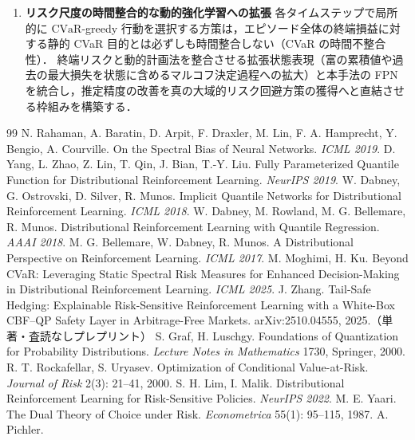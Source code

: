 \documentclass[a4paper,10pt]{jsarticle}
\theoremstyle{definition}
\newcommand{\CVaR}{\mathrm{CVaR}}
\begin{document}
\begin{enumerate}
  \item \textbf{リスク尺度の時間整合的な動的強化学習への拡張}\quad
  各タイムステップで局所的に $\CVaR$-greedy 行動を選択する方策は，エピソード全体の終端損益に対する静的 CVaR 目的とは必ずしも時間整合しない（CVaR の時間不整合性）．
  終端リスクと動的計画法を整合させる拡張状態表現（富の累積値や過去の最大損失を状態に含めるマルコフ決定過程への拡大）と本手法の FPN を統合し，推定精度の改善を真の大域的リスク回避方策の獲得へと直結させる枠組みを構築する．
\end{enumerate}

\begin{thebibliography}{99}
\footnotesize
{} N. Rahaman, A. Baratin, D. Arpit, F. Draxler, M. Lin, F. A. Hamprecht, Y. Bengio, A. Courville.
On the Spectral Bias of Neural Networks. \textit{ICML 2019}.
 D. Yang, L. Zhao, Z. Lin, T. Qin, J. Bian, T.-Y. Liu.
Fully Parameterized Quantile Function for Distributional Reinforcement Learning. \textit{NeurIPS 2019}.
 W. Dabney, G. Ostrovski, D. Silver, R. Munos.
Implicit Quantile Networks for Distributional Reinforcement Learning. \textit{ICML 2018}.
 W. Dabney, M. Rowland, M. G. Bellemare, R. Munos.
Distributional Reinforcement Learning with Quantile Regression. \textit{AAAI 2018}.
 M. G. Bellemare, W. Dabney, R. Munos.
A Distributional Perspective on Reinforcement Learning. \textit{ICML 2017}.
 M. Moghimi, H. Ku.
Beyond CVaR: Leveraging Static Spectral Risk Measures for Enhanced Decision-Making in Distributional Reinforcement Learning. \textit{ICML 2025}.
 J. Zhang.
Tail-Safe Hedging: Explainable Risk-Sensitive Reinforcement Learning with a White-Box CBF--QP Safety Layer in Arbitrage-Free Markets.
arXiv:2510.04555, 2025.（単著・査読なしプレプリント）
 S. Graf, H. Luschgy.
Foundations of Quantization for Probability Distributions. \textit{Lecture Notes in Mathematics} 1730, Springer, 2000.
 R. T. Rockafellar, S. Uryasev.
Optimization of Conditional Value-at-Risk. \textit{Journal of Risk} 2(3): 21--41, 2000.
 S. H. Lim, I. Malik.
Distributional Reinforcement Learning for Risk-Sensitive Policies. \textit{NeurIPS 2022}.
 M. E. Yaari.
The Dual Theory of Choice under Risk. \textit{Econometrica} 55(1): 95--115, 1987.
 A. Pichler.

\end{thebibliography}
\end{document}
